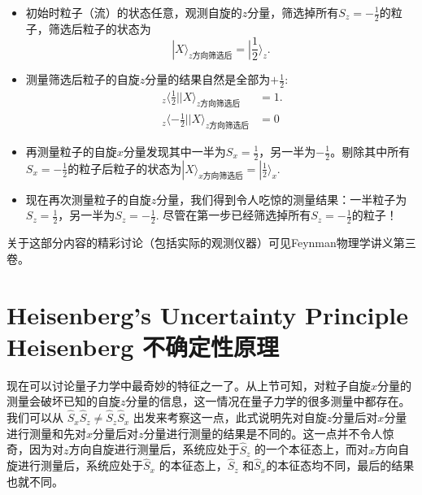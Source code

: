 \begin{itemize}
\item	初始时粒子（流）的状态任意，观测自旋的$z$分量，筛选掉所有$S_z = -\frac{1}{2}$的粒子，筛选后粒子的状态为
	\begin{equation}
		|X\rangle_{z\text{方向筛选后}} = |\frac{1}{2} \rangle_z.
	\label{equ8.58}
	\end{equation}
\item	测量筛选后粒子的自旋$z$分量的结果自然是全部为$+\frac{1}{2}$:
	\begin{align}
		\ _z\langle \frac{1}{2} || X \rangle_{z\text{方向筛选后}} &= 1.
	\label{equ8.59} \\
		\ _z \langle -\frac{1}{2} | |X \rangle_{z\text{方向筛选后}} &= 0
	\label{equ8.60}
	\end{align}
\item	再测量粒子的自旋$x$分量发现其中一半为$S_x = \frac{1}{2}$，另一半为$-\frac{1}{2}$。剔除其中所有$S_x = -\frac{1}{2}$的粒子后粒子的状态为$|X\rangle_{x\text{方向筛选后}} = |\frac{1}{2} \rangle_x$.
\item 	现在再次测量粒子的自旋$z$分量，我们得到令人吃惊的测量结果：一半粒子为$S_z = \frac{1}{2}$，另一半为$S_z = -\frac{1}{2}$. 尽管在第一步已经筛选掉所有$S_z = -\frac{1}{2}$的粒子！
\end{itemize}
关于这部分内容的精彩讨论（包括实际的观测仪器）可见Feynman物理学讲义第三卷。

\section[Heisenberg 不确定性原理]{Heisenberg’s Uncertainty Principle \quad Heisenberg 不确定性原理}\label{sec8.6}

现在可以讨论量子力学中最奇妙的特征之一了。从上节可知，对粒子自旋$x$分量的测量会破坏已知的自旋$z$分量的信息，这一情况在量子力学的很多测量中都存在。我们可以从 $\hat S_x \hat S_z \ne \hat S_z \hat S_x$ 出发来考察这一点，此式说明先对自旋$z$分量后对$x$分量进行测量和先对$x$分量后对$z$分量进行测量的结果是不同的。这一点并不令人惊奇，因为对$z$方向自旋进行测量后，系统应处于$\hat S_z$ 的一个本征态上，而对$x$方向自旋进行测量后，系统应处于$\hat S_x$ 的本征态上，$\hat S_z$ 和$\hat S_x$的本征态均不同，最后的结果也就不同。


